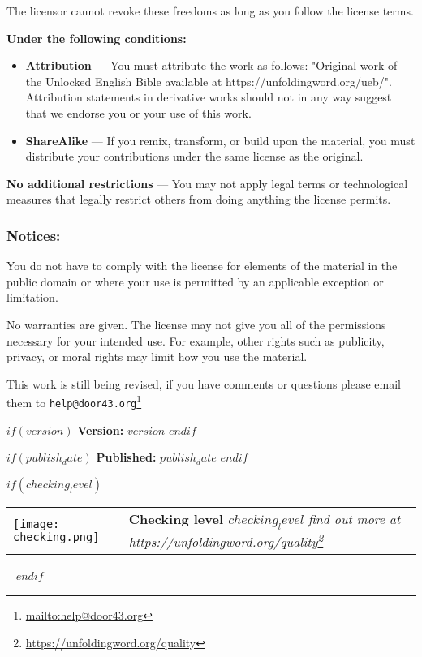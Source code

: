 \documentclass[$fontsize$pt,$if(lang)$$lang$,$endif$$if(papersize)$$papersize$,$endif$$for(classoption)$$classoption$$sep$,$endfor$,openany]{$documentclass$}
\renewcommand{\href}[2]{#2\footnote{\url{#1}}}
\begin{document}
The licensor cannot revoke these freedoms as long as you follow the license terms.

\textbf{Under the following conditions:}

\begin{itemize}
\item \textbf{Attribution} — You must attribute the work as follows: "Original work of the Unlocked English Bible available at https://unfoldingword.org/ueb/". Attribution statements in derivative works should not in any way suggest that we endorse you or your use of this work.
\item \textbf{ShareAlike} — If you remix, transform, or build upon the material, you must distribute your contributions under the same license as the original.
\end{itemize}

\textbf{No additional restrictions} — You may not apply legal terms or technological measures that legally restrict others from doing anything the license permits.

\subsubsection{Notices:}

You do not have to comply with the license for elements of the material in the public domain or where your use is permitted by an applicable exception or limitation.

No warranties are given. The license may not give you all of the permissions necessary for your intended use. For example, other rights such as publicity, privacy, or moral rights may limit how you use the material.

This work is still being revised, if you have comments or questions please email them to \href{mailto:help@door43.org}{\nolinkurl{help@door43.org}}

\vspace{10 mm}

$if(version)$
  \textbf{Version:} $version$
$endif$

$if(publish_date)$
  \textbf{Published:} $publish_date$
$endif$

$if(checking_level)$
\begin{tabular}{@{}p{1.5cm} p{10cm}@{}}
    \vspace{0pt}
    \texttt{[image: checking.png]}
    &
    \vspace{0pt}
    \textbf{Checking level $checking_level$}
    \newline
    \newline
    \em{find out more at \href{https://unfoldingword.org/quality}{https://unfoldingword.org/quality}}
\end{tabular}
\hfill\
$endif$
\end{document}
